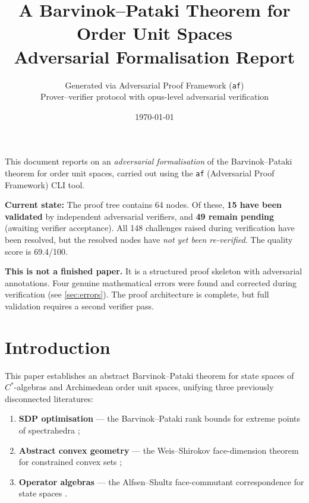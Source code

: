 \documentclass[11pt,a4paper]{article}
\title{\textbf{A Barvinok--Pataki Theorem for\\Order Unit Spaces}\\[0.5em]
       \large Adversarial Formalisation Report}
\author{Generated via Adversarial Proof Framework (\texttt{af})\\[0.3em]
        \small Prover--verifier protocol with opus-level adversarial verification}
\date{\today}
\theoremstyle{plain}
\theoremstyle{definition}
\theoremstyle{remark}
\begin{document}
\maketitle

\begin{statusbox}
This document reports on an \emph{adversarial formalisation} of the
Barvinok--Pataki theorem for order unit spaces, carried out using the
\texttt{af} (Adversarial Proof Framework) CLI tool.

\medskip\noindent
\textbf{Current state:} The proof tree contains 64 nodes. Of these,
\textbf{15 have been validated} by independent adversarial verifiers, and
\textbf{49 remain pending} (awaiting verifier acceptance). All 148 challenges
raised during verification have been resolved, but the resolved nodes have
\emph{not yet been re-verified}. The quality score is 69.4/100.

\medskip\noindent
\textbf{This is not a finished paper.} It is a structured proof skeleton
with adversarial annotations. Four genuine mathematical errors were found
and corrected during verification (see \cref{sec:errors}). The proof
architecture is complete, but full validation requires a second verifier pass.
\end{statusbox}

\tableofcontents
\newpage

\section{Introduction}
\label{sec:introduction}

This paper establishes an abstract Barvinok--Pataki theorem for state spaces
of $C^*$-algebras and Archimedean order unit spaces, unifying three previously
disconnected literatures:

\begin{enumerate}
  \item \textbf{SDP optimisation} --- the Barvinok--Pataki rank bounds
        for extreme points of spectrahedra
        \cite{barvinok2001,pataki1998,pataki2000};
  \item \textbf{Abstract convex geometry} --- the Weis--Shirokov face-dimension
        theorem for constrained convex sets \cite{weisshirokov2021};
  \item \textbf{Operator algebras} --- the Alfsen--Shultz face-commutant
        correspondence for state spaces \cite{alfsen2001,alfsen2003}.
\end{enumerate}
\end{document}
